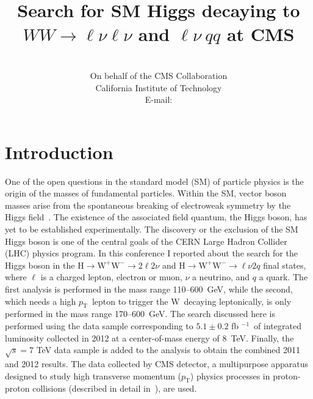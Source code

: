 \documentclass{PoS}
\title{Search for SM Higgs decaying to $WW\to \ell\nu\ell\nu$ and $\ell\nu~qq$ at CMS}
\author{\speaker{Emanuele Di Marco}\\
       {\rm On behalf of the CMS Collaboration}\\
       California Institute of Technology\\
       E-mail: \email{emanuele.di.marco@cern.ch}}
\newcommand{\Hi}{\ensuremath{\mathrm{H}}}
\newcommand{\W}{\ensuremath{\mathrm{W}}}
\newcommand{\WW}{\ensuremath{\W^+\W^-}}
\newcommand{\pt}{\ensuremath{p_\mathrm{T}}}
\newcommand{\usedLumiWithSyst}{\ensuremath{5.1 \pm 0.2} fb {\ensuremath{^{-1}}}}
\begin{document}
\section{Introduction}
One of the open questions in the standard model (SM) of particle
physics is the origin of the masses of fundamental
particles. Within the SM, vector boson masses arise from the
spontaneous breaking of electroweak symmetry by the Higgs
field~\cite{Higgs1, Higgs2}.  The
existence of the associated field quantum, the Higgs boson, has yet to
be established experimentally. The discovery or the exclusion of the
SM Higgs boson is one of the central goals of the CERN Large Hadron
Collider (LHC) physics program.
In this conference I reported about the search for the Higgs boson in
the $\Hi \to \WW \to 2\ell 2\nu$ and $\Hi \to \WW \to \ell \nu 2q$
final states, where $\ell$ is a charged lepton, electron or muon,
$\nu$ a neutrino, and $q$ a quark.  The first analysis is performed in
the mass range 110--600~GeV, while the second, which needs a high
\pt\ lepton to trigger the \W\ decaying leptonically, is only
performed in the mass range 170--600~GeV.  The search discussed here
is performed using the data sample corresponding to
\usedLumiWithSyst\ of integrated luminosity collected in 2012 at a
center-of-mass energy of 8~TeV. Finally, the $\sqrt{s} = 7$ TeV data
sample is added to the analysis to obtain the combined 2011 and 2012
results.  The data collected by CMS detector, a multipurpose apparatus
designed to study high transverse momentum ($\pt$) physics processes
in proton-proton collisions (described in detail
in~\cite{CMSdetector}), are used.

\end{document}
